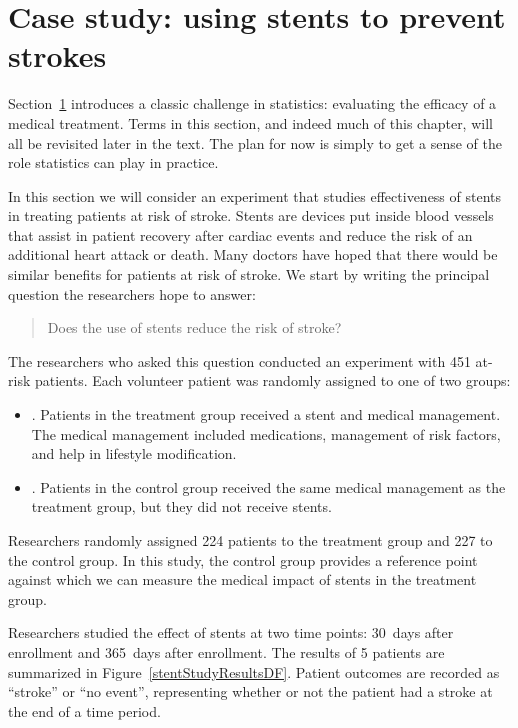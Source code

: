 \section{Case study: using stents to prevent strokes}
\label{basicExampleOfStentsAndStrokes}


Section~\ref{basicExampleOfStentsAndStrokes} introduces a classic challenge in statistics: evaluating the efficacy of a medical treatment. Terms in this section, and indeed much of this chapter, will all be revisited later in the text. The plan for now is simply to get a sense of the role statistics can play in practice.

In this section we will consider an experiment that studies effectiveness of stents in treating patients at risk of stroke.
Stents are devices put inside blood vessels that assist in patient recovery after cardiac events and reduce the risk of an additional heart attack or death. Many doctors have hoped that there would be similar benefits for patients at risk of stroke. We start by writing the principal question the researchers hope to answer:
\begin{quote}
Does the use of stents reduce the risk of stroke?
\end{quote}

The researchers who asked this question conducted an experiment with 451 at-risk patients. Each volunteer patient was randomly assigned to one of two groups:
\begin{itemize}
\item[]. Patients in the treatment group received a stent and medical management. The medical management included medications, management of risk factors, and help in lifestyle modification.
\item[]. Patients in the control group received the same medical management as the treatment group, but they did not receive stents.
\end{itemize}
Researchers randomly assigned 224 patients to the treatment group and 227 to the control group. In this study, the control group provides a reference point against which we can measure the medical impact of stents in the treatment group.

Researchers studied the effect of stents at two time points: 30~days after enrollment and 365~days after enrollment. The results of 5 patients are summarized in Figure~\ref{stentStudyResultsDF}. Patient outcomes are recorded as ``stroke'' or ``no event'', representing whether or not the patient had a stroke at the end of a time period.

